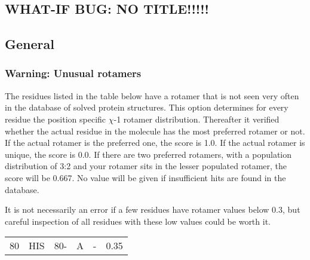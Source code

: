 \documentclass[a4paper]{article}
\def\showsect#1{
  \thesect\gdef\thesect{}
  \thessect\gdef\thessect{}
  \subsubsection{#1}
}
\gdef\thesect{\pagebreak[2]\section{WHAT-IF BUG: NO TITLE!!!!!}}
\gdef\thessect{\subsection{General}}
\begin{document}
\begin{warning}
\showsect{Warning: Unusual rotamers}
The residues listed in the table below have a rotamer that is not seen very
often in the database of solved protein structures. This option determines
for every residue the position specific $\chi$-1 rotamer distribution.
Thereafter it verified whether the actual residue in the molecule has the
most preferred rotamer or not. If the actual rotamer is the preferred one,
the score is 1.0. If the actual rotamer is unique, the score is 0.0. If
there are two preferred rotamers, with a population distribution of 3:2 and
your rotamer sits in the lesser populated rotamer, the score will be 0.667.
No value will be given if insufficient hits are found in the database.
 
It is not necessarily an error if a few residues have rotamer values below
0.3, but careful inspection of all residues with these low values could be
worth it.
 
\begin{center}
 
\begin{supertabular}{rr@{ (}r@{) }rll}
   80&HIS &  80-&A &-&  0.35\\
\end{supertabular}\end{center}
\end{warning}
\end{document}
